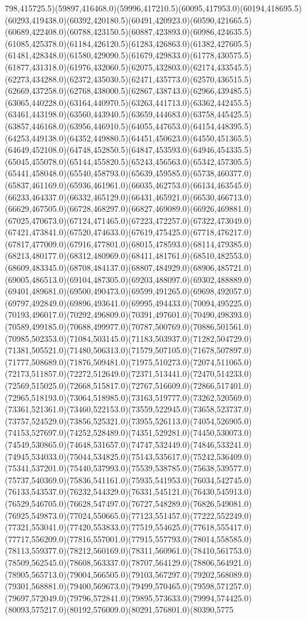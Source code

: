 \documentclass[conference]{IEEEtran}
\begin{document}
798,415725.5)(59897,416468.0)(59996,417210.5)(60095,417953.0)(60194,418695.5)(60293,419438.0)(60392,420180.5)(60491,420923.0)(60590,421665.5)(60689,422408.0)(60788,423150.5)(60887,423893.0)(60986,424635.5)(61085,425378.0)(61184,426120.5)(61283,426863.0)(61382,427605.5)(61481,428348.0)(61580,429090.5)(61679,429833.0)(61778,430575.5)(61877,431318.0)(61976,432060.5)(62075,432803.0)(62174,433545.5)(62273,434288.0)(62372,435030.5)(62471,435773.0)(62570,436515.5)(62669,437258.0)(62768,438000.5)(62867,438743.0)(62966,439485.5)(63065,440228.0)(63164,440970.5)(63263,441713.0)(63362,442455.5)(63461,443198.0)(63560,443940.5)(63659,444683.0)(63758,445425.5)(63857,446168.0)(63956,446910.5)(64055,447653.0)(64154,448395.5)(64253,449138.0)(64352,449880.5)(64451,450623.0)(64550,451365.5)(64649,452108.0)(64748,452850.5)(64847,453593.0)(64946,454335.5)(65045,455078.0)(65144,455820.5)(65243,456563.0)(65342,457305.5)(65441,458048.0)(65540,458793.0)(65639,459585.0)(65738,460377.0)(65837,461169.0)(65936,461961.0)(66035,462753.0)(66134,463545.0)(66233,464337.0)(66332,465129.0)(66431,465921.0)(66530,466713.0)(66629,467505.0)(66728,468297.0)(66827,469089.0)(66926,469881.0)(67025,470673.0)(67124,471465.0)(67223,472257.0)(67322,473049.0)(67421,473841.0)(67520,474633.0)(67619,475425.0)(67718,476217.0)(67817,477009.0)(67916,477801.0)(68015,478593.0)(68114,479385.0)(68213,480177.0)(68312,480969.0)(68411,481761.0)(68510,482553.0)(68609,483345.0)(68708,484137.0)(68807,484929.0)(68906,485721.0)(69005,486513.0)(69104,487305.0)(69203,488097.0)(69302,488889.0)(69401,489681.0)(69500,490473.0)(69599,491265.0)(69698,492057.0)(69797,492849.0)(69896,493641.0)(69995,494433.0)(70094,495225.0)(70193,496017.0)(70292,496809.0)(70391,497601.0)(70490,498393.0)(70589,499185.0)(70688,499977.0)(70787,500769.0)(70886,501561.0)(70985,502353.0)(71084,503145.0)(71183,503937.0)(71282,504729.0)(71381,505521.0)(71480,506313.0)(71579,507105.0)(71678,507897.0)(71777,508689.0)(71876,509481.0)(71975,510273.0)(72074,511065.0)(72173,511857.0)(72272,512649.0)(72371,513441.0)(72470,514233.0)(72569,515025.0)(72668,515817.0)(72767,516609.0)(72866,517401.0)(72965,518193.0)(73064,518985.0)(73163,519777.0)(73262,520569.0)(73361,521361.0)(73460,522153.0)(73559,522945.0)(73658,523737.0)(73757,524529.0)(73856,525321.0)(73955,526113.0)(74054,526905.0)(74153,527697.0)(74252,528489.0)(74351,529281.0)(74450,530073.0)(74549,530865.0)(74648,531657.0)(74747,532449.0)(74846,533241.0)(74945,534033.0)(75044,534825.0)(75143,535617.0)(75242,536409.0)(75341,537201.0)(75440,537993.0)(75539,538785.0)(75638,539577.0)(75737,540369.0)(75836,541161.0)(75935,541953.0)(76034,542745.0)(76133,543537.0)(76232,544329.0)(76331,545121.0)(76430,545913.0)(76529,546705.0)(76628,547497.0)(76727,548289.0)(76826,549081.0)(76925,549873.0)(77024,550665.0)(77123,551457.0)(77222,552249.0)(77321,553041.0)(77420,553833.0)(77519,554625.0)(77618,555417.0)(77717,556209.0)(77816,557001.0)(77915,557793.0)(78014,558585.0)(78113,559377.0)(78212,560169.0)(78311,560961.0)(78410,561753.0)(78509,562545.0)(78608,563337.0)(78707,564129.0)(78806,564921.0)(78905,565713.0)(79004,566505.0)(79103,567297.0)(79202,568089.0)(79301,568881.0)(79400,569673.0)(79499,570465.0)(79598,571257.0)(79697,572049.0)(79796,572841.0)(79895,573633.0)(79994,574425.0)(80093,575217.0)(80192,576009.0)(80291,576801.0)(80390,5775
\end{document}
